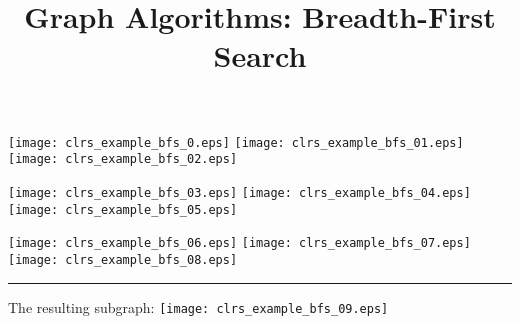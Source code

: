 \documentclass{article}
\title{Graph Algorithms: Breadth-First Search}
\begin{document}
\maketitle\newcommand\HR{\rule{.5em}{.4pt}}
\vspace{1em}


\vspace{1em}


\texttt{[image: clrs\_example\_bfs\_0.eps]}
\vspace{1em}
\texttt{[image: clrs\_example\_bfs\_01.eps]}
\vspace{1em}
\texttt{[image: clrs\_example\_bfs\_02.eps]}
\vspace{1em}


\texttt{[image: clrs\_example\_bfs\_03.eps]}
\vspace{1em}
\texttt{[image: clrs\_example\_bfs\_04.eps]}
\vspace{1em}
\texttt{[image: clrs\_example\_bfs\_05.eps]}
\vspace{1em}


\texttt{[image: clrs\_example\_bfs\_06.eps]}
\vspace{1em}
\texttt{[image: clrs\_example\_bfs\_07.eps]}
\vspace{1em}
\texttt{[image: clrs\_example\_bfs\_08.eps]}
\vspace{1em}


\HR
\begin{minipage}[b][.25\textheight]{0.303030303030303\linewidth}
The resulting subgraph: 
\texttt{[image: clrs\_example\_bfs\_09.eps]}
\end{minipage}
\end{document}
